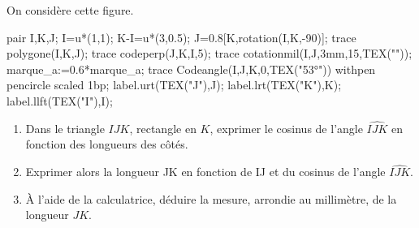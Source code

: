 \begin{exercice*}
    On considère cette figure.

    \begin{center}
        \begin{Geometrie}
            pair I,K,J;
            I=u*(1,1);
            K-I=u*(3,0.5);
            J=0.8[K,rotation(I,K,-90)];
            trace polygone(I,K,J);
            trace codeperp(J,K,I,5);
            trace cotationmil(I,J,3mm,15,TEX(""));
            marque_a:=0.6*marque_a;                
            trace Codeangle(I,J,K,0,TEX("\ang{53}")) withpen pencircle scaled 1bp;
            label.urt(TEX("J"),J);
            label.lrt(TEX("K"),K);
            label.llft(TEX("I"),I);
        \end{Geometrie}
    \end{center}
    \begin{enumerate}
        \item Dans le triangle $IJK$, rectangle en $K$, exprimer le cosinus de l'angle $\widehat{IJK}$ en fonction des longueurs des côtés.
        \item Exprimer alors la longueur JK en fonction de IJ et du cosinus de l'angle $\widehat{IJK}$.
        \item À l'aide de la calculatrice, déduire la mesure, arrondie au millimètre, de la longueur $JK$.
    \end{enumerate}
\end{exercice*}

